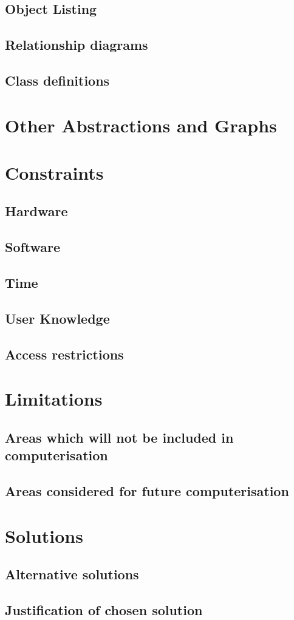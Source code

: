 \subsection{Object Listing}

\subsection{Relationship diagrams}

\subsection{Class definitions}

\section{Other Abstractions and Graphs}

\section{Constraints}

\subsection{Hardware}

\subsection{Software}

\subsection{Time}

\subsection{User Knowledge}

\subsection{Access restrictions}

\section{Limitations}

\subsection{Areas which will not be included in computerisation}
\subsection{Areas considered for future computerisation}

\section{Solutions}

\subsection{Alternative solutions}

\subsection{Justification of chosen solution}
